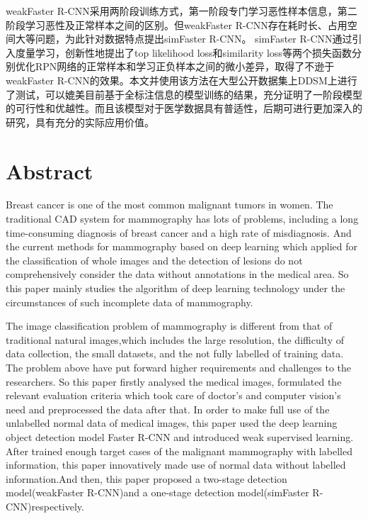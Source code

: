 weakFaster R-CNN采用两阶段训练方式，第一阶段专门学习恶性样本信息，第二阶段学习恶性及正常样本之间的区别。但weakFaster R-CNN存在耗时长、占用空间大等问题，为此针对数据特点提出simFaster R-CNN。
simFaster R-CNN通过引入度量学习，创新性地提出了top likelihood loss和similarity loss等两个损失函数分别优化RPN网络的正常样本和学习正负样本之间的微小差异，取得了不逊于weakFaster R-CNN的效果。本文并使用该方法在大型公开数据集上DDSM上进行了测试，可以媲美目前基于全标注信息的模型训练的结果，充分证明了一阶段模型的可行性和优越性。而且该模型对于医学数据具有普适性，后期可进行更加深入的研究，具有充分的实际应用价值。


\intobmk\chapter*{Abstract}%


Breast cancer is one of the most common malignant tumors in women. The traditional CAD system for mammography has lots of problems, including a long time-consuming diagnosis of breast cancer and a high rate of misdiagnosis. 
And the current methods for mammography based on deep learning which applied for the classification of whole images and the detection of lesions do not comprehensively consider the data without annotations in the medical area. 
So this paper mainly studies the algorithm of deep learning technology under the circumstances of such incomplete data of mammography.

The image classification problem of mammography is different from that of traditional natural images,which includes the large resolution, the difficulty of data collection, the small datasets, and the not fully labelled of training data. 
The problem above have put forward higher requirements and challenges to the researchers. So this paper firstly analysed the medical images, formulated the relevant evaluation criteria which took care of doctor's and computer vision's need and preprocessed the data after that.
In order to make full use of the unlabelled normal data of medical images, this paper used the deep learning object detection model Faster R-CNN and introduced weak supervised learning.
After trained enough target cases of the malignant mammography with labelled information, this paper innovatively made use of normal data without labelled information.And then, this paper proposed a two-stage detection model(weakFaster R-CNN)and a one-stage detection model(simFaster R-CNN)respectively.

